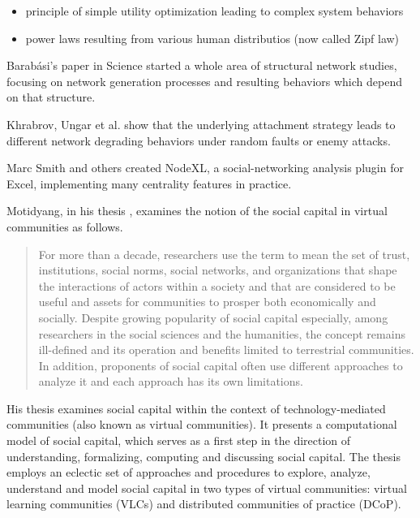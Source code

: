 \documentclass[10pt,oneside]{memoir}
\begin{document}
\begin{itemize}


\item principle of simple utility optimization leading to complex system behaviors

\item power laws resulting from various human distributios (now called Zipf law)
\end{itemize}

Barabási's paper in Science \cite{barabasi1999scaling} started a whole area of structural network studies, focusing on network generation processes and resulting behaviors which depend on that structure.


Khrabrov, Ungar et al. \cite{Khrabrov:2003:Attacks} show that the underlying attachment strategy leads to different network degrading behaviors under random faults or enemy attacks.


Marc Smith and others created NodeXL, a social-networking analysis plugin for Excel, implementing many centrality features in practice.  


Motidyang, in his thesis \cite{Motidyang:2007:Thesis}, examines the notion of the social capital in virtual communities as follows.


\begin{quote}
For more than a decade, researchers use the term to mean the set of trust, institutions, social norms, social networks, and organizations that shape the interactions of actors within a society and that are considered to be useful and assets for communities to prosper both economically and socially. Despite growing popularity of social capital especially, among researchers in the social sciences and the humanities, the concept remains ill-defined and its operation and benefits limited to terrestrial communities. In addition, proponents of social capital often use different approaches to analyze it and each approach has its own limitations.
\end{quote}


His thesis examines social capital within the context of technology-mediated communities (also known as virtual communities). It presents a computational model of social capital, which serves as a first step in the direction of understanding, formalizing, computing and discussing social capital. The thesis employs an eclectic set of approaches and procedures to explore, analyze, understand and model social capital in two types of virtual communities: virtual learning communities (VLCs) and distributed communities of practice (DCoP).
\end{document}
